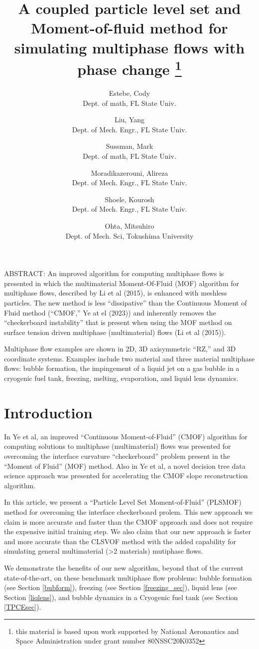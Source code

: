 \documentclass[]{article}
\title{A coupled particle level set and Moment-of-fluid method 
  for simulating multiphase flows with phase change
  \thanks{this material is based upon work supported by National
   Aeronautics and Space Administration under grant number
   80NSSC20K0352}}
\author{
  Estebe, Cody \\
  Dept. of math, FL State Univ. 
  \and
  Liu, Yang \\
  Dept. of Mech. Engr., FL State Univ.
  \and
  Sussman, Mark \\
  Dept. of math, FL State Univ. 
  \and
  Moradikazerouni, Alireza \\
  Dept. of Mech. Engr., FL State Univ.
  \and
  Shoele, Kourosh  \\
  Dept. of Mech. Engr., FL State Univ.
  \and
  Ohta, Mitsuhiro \\
  Dept. of Mech. Sci, Tokushima University 
}
\begin{document}
\maketitle

ABSTRACT:
An improved algorithm for computing multiphase flows is presented in 
which the multimaterial Moment-Of-Fluid (MOF) algorithm for multiphase flows, 
described by Li et al (2015), is enhanced with 
meshless particles.  The new method is less ``dissipative'' than the 
Continuous Moment of Fluid method (``CMOF,'' Ye at el (2023)) and inherently 
removes the ``checkerboard instability'' that is present when using the 
MOF method on surface tension driven multiphase (multimaterial) 
flows (Li et al (2015)).

Multiphase flow examples are shown in 2D, 3D axisymmetric ``RZ,'' and 
3D coordinate systems.  Examples include two material and three 
material multiphase flows: bubble formation, the impingement of a 
liquid jet on a gas bubble in a cryogenic fuel tank, freezing, melting,
evaporation, and liquid lens dynamics.
\linenumbers
\section{Introduction}
In Ye et al\cite{YeEstebe...},
an improved ``Continuous Moment-of-Fluid'' (CMOF) algorithm
for computing solutions to multiphase (multimaterial) flows was
presented for overcoming the interface curvature ``checkerboard'' problem
present in the ``Moment of Fluid'' (MOF) \cite{MOF} method.  
Also in Ye et al\cite{YeEstebe...}, a novel decision tree data science 
approach was presented for accelerating the CMOF slope reconstruction 
algorithm.   

In this article, we present a ``Particle Level Set Moment-of-Fluid'' (PLSMOF)
method for overcoming the interface checkerboard prolem.  This new approach
we claim is more accurate and faster than the CMOF approach and 
does not require the expensive initial training step.  We also claim that
our new approach is faster and more accurate than the CLSVOF 
method\cite{SusPuckett} with the added capability for simulating
general multimaterial (>2 materials) mutiphase flows.

We demonstrate the benefits of our new algorithm, beyond that of the 
current state-of-the-art, on these benchmark multiphase flow
problems:
bubble formation\cite{helsby1955behaviour} (see Section \ref{bubform}),
freezing\cite{hu2010icing} (see Section \ref{freezing_sec}), 
liquid lens\cite{MIAO2021109358} (see Section \ref{liqlens}),
and bubble dynamics in a Cryogenic fuel 
tank\cite{bentz1993low} (see Section \ref{TPCEsec}).
\end{document}
